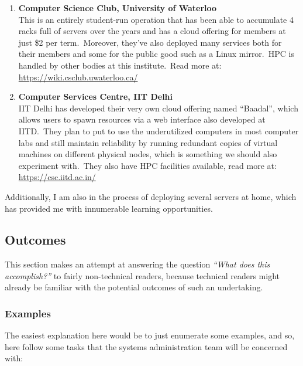 \begin{enumerate}
    \item \textbf{Computer Science Club, University of Waterloo}\\
    This is an entirely student-run operation that has been able to accumulate 4 racks full of servers over the years
    and has a cloud offering for members at just \$2 per term.\ Moreover, they've also deployed many services both for
    their members and some for the public good such as a Linux mirror.\ HPC is handled by other bodies at this
    institute.\ Read more at:\\
    \href{https://wiki.csclub.uwaterloo.ca/}{\color{blue}\url{https://wiki.csclub.uwaterloo.ca/}}

    \item \textbf{Computer Services Centre, IIT Delhi}\\
    IIT Delhi has developed their very own cloud offering named ``Baadal'', which allows users to spawn resources via a
    web interface also developed at IITD.\ They plan to put to use the underutilized computers in most computer labs and
    still maintain reliability by running redundant copies of virtual machines on different physical nodes, which is
    something we should also experiment with.\ They also have HPC facilities available, read more at:\\
    \href{https://csc.iitd.ac.in/}{\color{blue}\url{https://csc.iitd.ac.in/}}
\end{enumerate}

Additionally, I am also in the process of deploying several servers at home, which has provided me with innumerable
learning opportunities.


\subsection{Outcomes}\label{subsec:outcomes}
This section makes an attempt at answering the question \emph{``What does this accomplish?''} to fairly non-technical
readers, because technical readers might already be familiar with the potential outcomes of such an undertaking.

\subsubsection{Examples}
The easiest explanation here would be to just enumerate some examples, and so, here follow some tasks that the systems
administration team will be concerned with:

